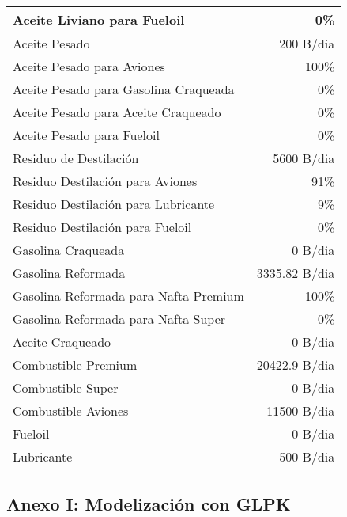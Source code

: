 \documentclass[a4paper,10pt]{article}
\begin{document}
\begin{center}
\begin{tabular}{ l  r }
	Aceite Liviano para Fueloil		& 	  0\%	\\ \hline
	Aceite Pesado 				&	200 B/dia	\\
	Aceite Pesado para Aviones		& 	  100\%	\\
	Aceite Pesado para Gasolina Craqueada	& 	  0\%	\\
	Aceite Pesado para Aceite Craqueado		& 	  0\%	\\
	Aceite Pesado para Fueloil		& 	  0\%	\\ \hline
	Residuo de Destilaci\'on		& 	5600 B/dia	\\ 
	Residuo Destilaci\'on para Aviones	& 	91\%	\\ 
	Residuo Destilaci\'on para Lubricante	& 	9\%	\\ 
	Residuo Destilaci\'on para Fueloil	& 	0\%	\\ \hline
	Gasolina Craqueada			&	0 B/dia	\\ \hline
	Gasolina Reformada			&	3335.82 B/dia	\\ \hline
	Gasolina Reformada para Nafta Premium  &	100\%	\\
	Gasolina Reformada para Nafta Super	&	0\%	\\ \hline
	Aceite Craqueado 			&	0 B/dia \\ \hline
	Combustible Premium			&	20422.9 B/dia\\                
	Combustible Super			& 	0 B/dia\\ 
	Combustible Aviones 			&	11500 B/dia \\                
	Fueloil 				 &      0 B/dia \\ 
	Lubricante				 &      500 B/dia	\\        
	
 \end{tabular}

\end{center}





\newpage
\subsection{Anexo I: Modelizaci\'on con GLPK}
\end{document}

